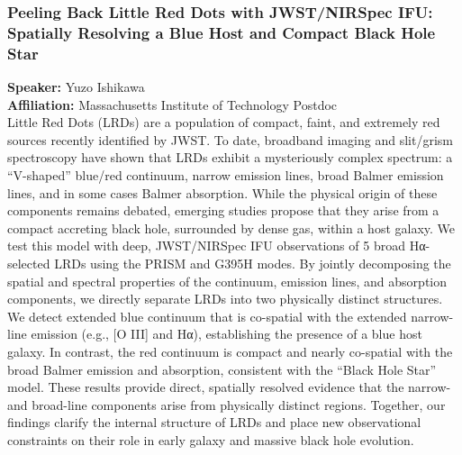 \subsubsection*{Peeling Back Little Red Dots with JWST/NIRSpec IFU: Spatially Resolving a Blue Host and Compact Black Hole Star}
\textbf{Speaker:} Yuzo Ishikawa \\
\textbf{Affiliation:} Massachusetts Institute of Technology \textperiodcentered{} Postdoc\\
Little Red Dots (LRDs) are a population of compact, faint, and extremely red sources recently identified by JWST. To date, broadband imaging and slit/grism spectroscopy have shown that LRDs exhibit a mysteriously complex spectrum: a “V-shaped” blue/red continuum, narrow emission lines, broad Balmer emission lines, and in some cases Balmer absorption. While the physical origin of these components remains debated, emerging studies propose that they arise from a compact accreting black hole, surrounded by dense gas, within a host galaxy. We test this model with deep, JWST/NIRSpec IFU observations of 5 broad Hα-selected LRDs using the PRISM and G395H modes. By jointly decomposing the spatial and spectral properties of the continuum, emission lines, and absorption components, we directly separate LRDs into two physically distinct structures. We detect extended blue continuum that is co-spatial with the extended narrow-line emission (e.g., [O III] and Hα), establishing the presence of a blue host galaxy. In contrast, the red continuum is compact and nearly co-spatial with the broad Balmer emission and absorption, consistent with the “Black Hole Star” model. These results provide direct, spatially resolved evidence that the narrow- and broad-line components arise from physically distinct regions. Together, our findings clarify the internal structure of LRDs and place new observational constraints on their role in early galaxy and massive black hole evolution.

\hypertarget{abs-60}{}
